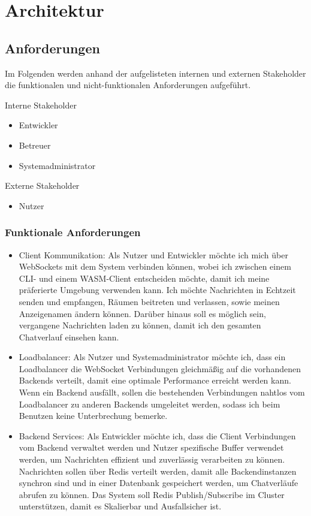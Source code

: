 
\chapter{Architektur}

\section{Anforderungen}

Im Folgenden werden anhand der aufgelisteten internen und externen Stakeholder die funktionalen und nicht-funktionalen Anforderungen aufgeführt.

Interne Stakeholder

\begin{itemize}
  \item Entwickler
  \item Betreuer
  \item Systemadministrator
\end{itemize}

Externe Stakeholder
\begin{itemize}
  \item Nutzer
\end{itemize}

\subsection{Funktionale Anforderungen}
\begin{itemize}
  \item Client Kommunikation: 
    Als Nutzer und Entwickler möchte ich mich über WebSockets mit dem System verbinden können, wobei ich zwischen einem CLI- und einem WASM-Client entscheiden möchte, damit ich meine präferierte Umgebung verwenden kann. Ich möchte Nachrichten in Echtzeit senden und empfangen, Räumen beitreten und verlassen, sowie meinen Anzeigenamen ändern können. Darüber hinaus soll es möglich sein, vergangene Nachrichten laden zu können, damit ich den gesamten Chatverlauf einsehen kann.
  \item Loadbalancer: Als Nutzer und Systemadministrator möchte ich, dass ein Loadbalancer die WebSocket Verbindungen gleichmäßig auf die vorhandenen Backends verteilt, damit eine optimale Performance erreicht werden kann. Wenn ein Backend ausfällt, sollen die bestehenden Verbindungen nahtlos vom Loadbalancer zu anderen Backends umgeleitet werden, sodass ich beim Benutzen keine Unterbrechung bemerke.
  \item Backend Services: Als Entwickler möchte ich, dass die Client Verbindungen vom Backend verwaltet werden und Nutzer spezifische Buffer verwendet werden, um Nachrichten effizient und zuverlässig verarbeiten zu können. Nachrichten sollen über Redis verteilt werden, damit alle Backendinstanzen synchron sind und in einer Datenbank gespeichert werden, um Chatverläufe abrufen zu können. Das System soll Redis Publish/Subscribe im Cluster unterstützen, damit es Skalierbar und Ausfallsicher ist.
\end{itemize}

